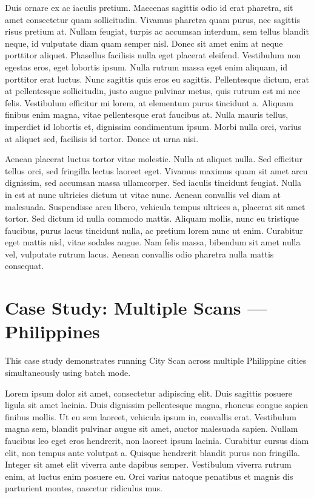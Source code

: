 \documentclass[
  letterpaper,
  DIV=11,
  numbers=noendperiod]{scrreprt}
\begin{document}
Duis ornare ex ac iaculis pretium. Maecenas sagittis odio id erat
pharetra, sit amet consectetur quam sollicitudin. Vivamus pharetra quam
purus, nec sagittis risus pretium at. Nullam feugiat, turpis ac accumsan
interdum, sem tellus blandit neque, id vulputate diam quam semper nisl.
Donec sit amet enim at neque porttitor aliquet. Phasellus facilisis
nulla eget placerat eleifend. Vestibulum non egestas eros, eget lobortis
ipsum. Nulla rutrum massa eget enim aliquam, id porttitor erat luctus.
Nunc sagittis quis eros eu sagittis. Pellentesque dictum, erat at
pellentesque sollicitudin, justo augue pulvinar metus, quis rutrum est
mi nec felis. Vestibulum efficitur mi lorem, at elementum purus
tincidunt a. Aliquam finibus enim magna, vitae pellentesque erat
faucibus at. Nulla mauris tellus, imperdiet id lobortis et, dignissim
condimentum ipsum. Morbi nulla orci, varius at aliquet sed, facilisis id
tortor. Donec ut urna nisi.

Aenean placerat luctus tortor vitae molestie. Nulla at aliquet nulla.
Sed efficitur tellus orci, sed fringilla lectus laoreet eget. Vivamus
maximus quam sit amet arcu dignissim, sed accumsan massa ullamcorper.
Sed iaculis tincidunt feugiat. Nulla in est at nunc ultricies dictum ut
vitae nunc. Aenean convallis vel diam at malesuada. Suspendisse arcu
libero, vehicula tempus ultrices a, placerat sit amet tortor. Sed dictum
id nulla commodo mattis. Aliquam mollis, nunc eu tristique faucibus,
purus lacus tincidunt nulla, ac pretium lorem nunc ut enim. Curabitur
eget mattis nisl, vitae sodales augue. Nam felis massa, bibendum sit
amet nulla vel, vulputate rutrum lacus. Aenean convallis odio pharetra
nulla mattis consequat.

\chapter{Case Study: Multiple Scans ---
Philippines}\label{case-study-multiple-scans-philippines}

This case study demonstrates running City Scan across multiple
Philippine cities simultaneously using batch mode.

Lorem ipsum dolor sit amet, consectetur adipiscing elit. Duis sagittis
posuere ligula sit amet lacinia. Duis dignissim pellentesque magna,
rhoncus congue sapien finibus mollis. Ut eu sem laoreet, vehicula ipsum
in, convallis erat. Vestibulum magna sem, blandit pulvinar augue sit
amet, auctor malesuada sapien. Nullam faucibus leo eget eros hendrerit,
non laoreet ipsum lacinia. Curabitur cursus diam elit, non tempus ante
volutpat a. Quisque hendrerit blandit purus non fringilla. Integer sit
amet elit viverra ante dapibus semper. Vestibulum viverra rutrum enim,
at luctus enim posuere eu. Orci varius natoque penatibus et magnis dis
parturient montes, nascetur ridiculus mus.
\end{document}
